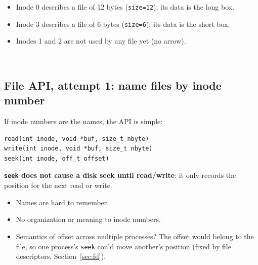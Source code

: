 \documentclass[11pt,a4paper]{article}
\makeatletter
\newcommand{\keepspace}[1]{\par\penalty-100\begingroup
  \setlength{\dimen@}{#1}\dimen@ii\pagegoal\advance\dimen@ii-\pagetotal
  \ifdim\dimen@>\dimen@ii\ifdim\dimen@ii>\z@\vfil\fi\break\fi\endgroup}
\newcommand{\inodecol}{%
  \foreach \k/\s in {0/size=12,1/size,2/size,3/size=6} {
    \node[icell] (i\k) at (0,-\k*1.05) {location\\\s};
    \node[font=\small] at (-1.35,-\k*1.05) {\k};
  }
  \node at (0,-3.95) {\ldots};
  \node[font=\small\bfseries, above=2pt] at (i0.north) {inodes};
  \node[rotate=90, font=\small] at (-1.95,-1.575) {inode number};
}
\makeatother
\begin{document}
\begin{center}
\end{center}

\begin{itemize}
  \item Inode 0 describes a file of 12 bytes (\texttt{size=12}); its data is
        the long box.
  \item Inode 3 describes a file of 6 bytes (\texttt{size=6}); its data is
        the short box.
  \item Inodes 1 and 2 are not used by any file yet (no arrow).
\end{itemize}

\keepspace{7\baselineskip}
\subsection{File API, attempt 1: name files by inode number}

If inode numbers are the names, the API is simple:

\begin{lstlisting}[numbers=none]
read(int inode, void *buf, size_t nbyte)
write(int inode, void *buf, size_t nbyte)
seek(int inode, off_t offset)
\end{lstlisting}

\textbf{\texttt{seek} does not cause a disk seek until read/write}: it only
records the position for the next read or write.

\begin{quizbox}[Disadvantages?]
\begin{itemize}
  \item Names are hard to remember.
  \item No organization or meaning to inode numbers.
  \item Semantics of offset across multiple processes? The offset would belong
        to the file, so one process's \texttt{seek} could move another's
        position (fixed by file descriptors, Section~\ref{sec:fd}).
\end{itemize}
\end{quizbox}
\end{document}
